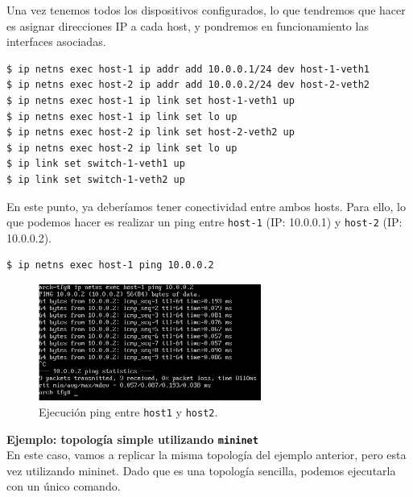 \documentclass[a4paper, oneside, 12pt]{book}
\begin{document}
	\noindent Una vez tenemos todos los dispositivos configurados, lo que tendremos que hacer es asignar direcciones IP a cada host, y pondremos en funcionamiento las interfaces asociadas.
	
	\begin{verbatim}
$ ip netns exec host-1 ip addr add 10.0.0.1/24 dev host-1-veth1
$ ip netns exec host-2 ip addr add 10.0.0.2/24 dev host-2-veth2
$ ip netns exec host-1 ip link set host-1-veth1 up
$ ip netns exec host-1 ip link set lo up
$ ip netns exec host-2 ip link set host-2-veth2 up
$ ip netns exec host-2 ip link set lo up
$ ip link set switch-1-veth1 up
$ ip link set switch-1-veth2 up
	\end{verbatim}

	\pagebreak

	\noindent En este punto, ya deberíamos tener conectividad entre ambos hosts. Para ello, lo que podemos hacer es realizar un ping entre \texttt{host-1} (IP: 10.0.0.1) y \texttt{host-2} (IP: 10.0.0.2).
	
	\begin{verbatim}
$ ip netns exec host-1 ping 10.0.0.2
	\end{verbatim}

	\begin{figure}[h!]
		\begin{center}
			\includegraphics[width=0.65\textwidth]{img/ns_single_2.png}
			\caption{Ejecución ping entre \texttt{host1} y \texttt{host2}.}
		\end{center}
	\end{figure}
	
	\vspace{10px}
	
	\noindent \textbf{\large Ejemplo: topología simple utilizando \texttt{mininet}}\\
	
	\noindent En este caso, vamos a replicar la misma topología del ejemplo anterior, pero esta vez utilizando mininet. Dado que es una topología sencilla, podemos ejecutarla con un único comando. 
	
\end{document}
